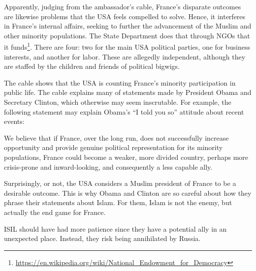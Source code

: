 Apparently, judging from the ambassador's cable, France's disparate outcomes are likewise problems that the USA feels compelled to solve. Hence, it interferes in France's internal affairs, seeking to further the advancement of the Muslim and other minority populations. The State Department does that through NGOs that it funds\footnote{\url{https://en.wikipedia.org/wiki/National\_Endowment\_for\_Democracy}}. There are four: two for the main USA political parties, one for business interests, and another for labor. These are allegedly independent, although they are staffed by the children and friends of political bigwigs.

The cable shows that the USA is counting France's minority participation in public life. The cable explains many of statements made by President Obama and Secretary Clinton, which otherwise may seem inscrutable. For example, the following statement may explain Obama's ``I told you so'' attitude about recent events:

\begin{quotex}
We believe that if France, over the long run, does not successfully increase opportunity and provide genuine political representation for its minority populations, France could become a weaker, more divided country, perhaps more crisis-prone and inward-looking, and consequently a less capable ally.
\end{quotex}


Surprisingly, or not, the USA considers a Muslim president of France to be a desirable outcome. This is why Obama and Clinton are so careful about how they phrase their statements about Islam. For them, Islam is not the enemy, but actually the end game for France.

ISIL should have had more patience since they have a potential ally in an unexpected place. Instead, they risk being annihilated by Russia.


